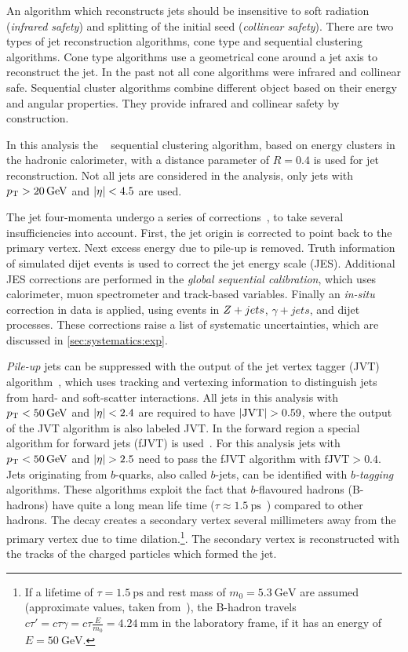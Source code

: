 An algorithm which reconstructs jets should be insensitive to soft radiation (\emph{infrared safety})
and splitting of the initial seed (\emph{collinear safety}).
There are two types of jet reconstruction algorithms, cone type and sequential clustering algorithms.
Cone type algorithms use a geometrical cone around a jet axis to reconstruct the jet. In the past not
all cone algorithms were infrared and collinear safe.
Sequential cluster algorithms combine different object based on their energy and angular properties.
They provide infrared and collinear safety by construction.

In this analysis the \antikt{}~\cite{Cacciari:2008gp,Cacciari:2005hq} sequential clustering algorithm, based on energy clusters in the
hadronic calorimeter, with a distance parameter of $R = 0.4$ is used for jet reconstruction.
Not all jets are considered in the analysis, only jets with $\pt > \SI{20}{\GeV}$ and $\left|\eta\right| < 4.5$ are used.

The jet four-momenta undergo a series of corrections~\cite{PERF-2016-04}, to take several insufficiencies into account.
First, the jet origin is corrected to point back to the primary vertex. Next excess energy due to pile-up is removed.
Truth information of simulated dijet events is used to correct the jet energy scale (JES).
Additional JES corrections are performed in the \emph{global sequential calibration}, which uses calorimeter, muon
spectrometer and track-based variables. Finally an \emph{in-situ} correction in data is applied, using events
in $Z+jets$, $\gamma + jets$, and dijet processes.
These corrections raise a list of systematic uncertainties, which are discussed in \cref{sec:systematics:exp}.

\emph{Pile-up} jets can be suppressed with the output of the jet vertex tagger (JVT) algorithm~\cite{PERF-2014-03}, which
uses tracking and vertexing information to distinguish jets from hard- and soft-scatter interactions.
All jets in this analysis with $\pt < \SI{50}{\GeV}$ and $\left|\eta\right| < 2.4$ are required to have $\left|\text{JVT}\right| > 0.59$, where the output of the
JVT algorithm is also labeled JVT\@.
In the forward region a special algorithm for forward jets (fJVT) is used~\cite{ATL-PHYS-PUB-2015-034}.
For this analysis jets with $\pt < \SI{50}{\GeV}$ and $\left|\eta\right| > 2.5$ need to pass the fJVT algorithm with
$\text{fJVT} > 0.4$.
\\[\baselineskip]
Jets originating from $b$-quarks, also called $b$-jets, can be identified with \emph{$b$-tagging} algorithms.
These algorithms exploit the fact that $b$-flavoured hadrons (B-hadrons) have quite a long mean life time
($\tau \approx \SI{1.5}{\ps}$~\cite{PDG}) compared to other hadrons.
The decay creates a secondary vertex several millimeters away from the primary vertex due to time
dilation.\footnote{If a lifetime of $\tau = \SI{1.5}{\ps}$ and rest mass of $m_0 = \SI{5.3}{\GeV}$ are assumed (approximate values, taken from~\cite{PDG}),
the B-hadron travels $c\tau' = c \tau \gamma = c \tau \frac{E}{m_0} = \SI{4.24}{\mm}$ in the laboratory frame, if it has an energy of $E = \SI{50}{\GeV}$.}.
The secondary vertex is reconstructed with the tracks of the charged particles which formed the jet.

